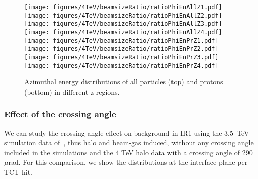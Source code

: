 \begin{figure}%
\begin{center}
  \texttt{[image: figures/4TeV/beamsizeRatio/ratioPhiEnAllZ1.pdf]}
  \texttt{[image: figures/4TeV/beamsizeRatio/ratioPhiEnAllZ2.pdf]}
  \texttt{[image: figures/4TeV/beamsizeRatio/ratioPhiEnAllZ3.pdf]}
  \texttt{[image: figures/4TeV/beamsizeRatio/ratioPhiEnAllZ4.pdf]}
  \texttt{[image: figures/4TeV/beamsizeRatio/ratioPhiEnPrZ1.pdf]}
  \texttt{[image: figures/4TeV/beamsizeRatio/ratioPhiEnPrZ2.pdf]}
  \texttt{[image: figures/4TeV/beamsizeRatio/ratioPhiEnPrZ3.pdf]}
  \texttt{[image: figures/4TeV/beamsizeRatio/ratioPhiEnPrZ4.pdf]}
\end{center}
\vspace{-0.6cm}
 \caption{Azimuthal energy distributions of all particles (top) and protons (bottom) in different z-regions.
  \label{bsZ}}
\end{figure}

 
\subsubsection{Effect of the crossing angle}

We can study the crossing angle effect on background in IR1 using the 3.5~TeV simulation data of~\cite{nimPaperRod}, thus halo and beam-gas induced, without any crossing angle included in the simulations and the 4 TeV halo data with a crossing angle of 290~$\mu$rad. For this comparison, we show the distributions at the interface plane per TCT hit. 

